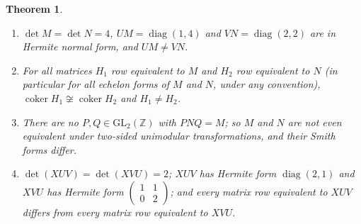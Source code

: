 \documentclass[11pt]{article}
\renewcommand{\_}{\oldus\allowbreak}
\newtheorem{theorem}{Theorem}
\theoremstyle{remark}
\newcommand{\Z}{\mathbb{Z}}
\newcommand{\GL}{\mathrm{GL}}
\begin{document}
\begin{theorem}\label{thm:main}
\begin{enumerate}
\item $\det M=\det N=4$, $UM=\operatorname{diag}(1,4)$ and $VN=\operatorname{diag}(2,2)$
are in Hermite normal form, and $UM\neq VN$.
\item For all matrices $H_1$ row equivalent to $M$ and $H_2$ row equivalent to $N$
(in particular for all echelon forms of $M$ and $N$, under any convention),
$\operatorname{coker}H_1\not\cong\operatorname{coker}H_2$ and $H_1\neq H_2$.
\item There are no $P,Q\in\GL_2(\Z)$ with $PNQ=M$; so $M$ and $N$ are not even
equivalent under two-sided unimodular transformations, and their Smith forms differ.
\item $\det(XUV)=\det(XVU)=2$; $XUV$ has Hermite form $\operatorname{diag}(2,1)$ and
$XVU$ has Hermite form $\begin{pmatrix}1&1\\0&2\end{pmatrix}$; and every matrix row
equivalent to $XUV$ differs from every matrix row equivalent to $XVU$.
\end{enumerate}
\end{theorem}
\end{document}

